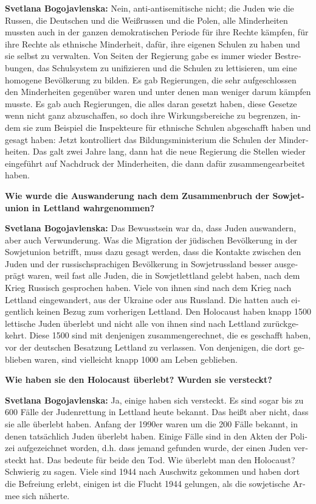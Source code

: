 \begin{otherlanguage}{ngerman}
\textbf{Svetlana Bogojavlenska:} Nein, anti-antisemitische nicht; die Juden wie die Russen, die Deutschen und die Weißrussen und die Polen, alle Minderheiten mussten auch in der ganzen demokratischen Periode für ihre Rechte kämpfen, für ihre Rechte als ethnische Minderheit, dafür, ihre eigenen Schulen zu haben und sie selbst zu verwalten. Von Seiten der Regierung gabe es immer wieder Bestrebungen, das Schulsystem zu unifizieren und die Schulen zu lettisieren, um eine homogene Bevölkerung zu bilden. Es gab Regierungen, die sehr aufgeschlossen den Minderheiten gegenüber waren und unter denen man weniger darum kämpfen musste. Es gab auch Regierungen, die alles daran gesetzt haben, diese Gesetze wenn nicht ganz abzuschaffen, so doch ihre Wirkungsbereiche zu begrenzen, indem sie zum Beispiel die Inspekteure für ethnische Schulen abgeschafft haben und gesagt haben: Jetzt kontrolliert das Bildungsministerium die Schulen der Minderheiten. Das galt zwei Jahre lang, dann hat die neue Regierung die Stellen wieder eingeführt auf Nachdruck der Minderheiten, die dann dafür zusammengearbeitet haben.

\textbf{Wie wurde die Auswanderung nach dem Zusammenbruch der Sowjetunion in Lettland wahrgenommen?}

\textbf{Svetlana Bogojavlenska:} Das Bewusstsein war da, dass Juden auswandern, aber auch Verwunderung. Was die Migration der jüdischen Bevölkerung in der Sowjetunion betrifft, muss dazu gesagt werden, dass die Kontakte zwischen den Juden und der russischsprachigen Bevölkerung in Sowjetrussland besser ausgeprägt waren, weil fast alle Juden, die in Sowjetlettland gelebt haben, nach dem Krieg Russisch gesprochen haben. Viele von ihnen sind nach dem Krieg nach Lettland eingewandert, aus der Ukraine oder aus Russland. Die hatten auch eigentlich keinen Bezug zum vorherigen Lettland. Den Holocaust haben knapp 1500 lettische Juden überlebt und nicht alle von ihnen sind nach Lettland zurückgekehrt. Diese 1500 sind mit denjenigen zusammengerechnet, die es geschafft haben, vor der deutschen Besatzung Lettland zu verlassen. Von denjenigen, die dort geblieben waren, sind vielleicht knapp 1000 am Leben geblieben.

\textbf{Wie haben sie den Holocaust überlebt? Wurden sie versteckt?}

\textbf{Svetlana Bogojavlenska:} Ja, einige haben sich versteckt. Es sind sogar bis zu 600 Fälle der Judenrettung in Lettland heute bekannt. Das heißt aber nicht, dass sie alle überlebt haben. Anfang der 1990er waren um die 200 Fälle bekannt, in denen tatsächlich Juden überlebt haben. Einige Fälle sind in den Akten der Polizei aufgezeichnet worden, d.h. dass jemand gefunden wurde, der einen Juden versteckt hat. Das bedeute für beide den Tod. Wie überlebt man den Holocaust? Schwierig zu sagen. Viele sind 1944 nach Auschwitz gekommen und haben dort die Befreiung erlebt, einigen ist die Flucht 1944 gelungen, als die sowjetische Armee sich näherte.


\end{otherlanguage}
